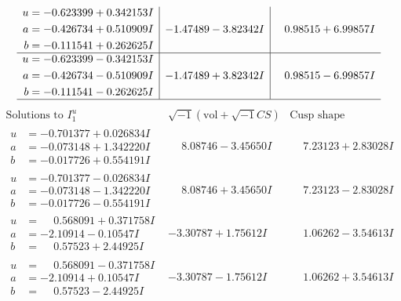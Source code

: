 \documentclass[1p]{elsarticle_modified}
\theoremstyle{definition}
\newcommand{\I}{\sqrt{-1}}
\begin{document}
$$\begin{array}{c|c|c}
\begin{aligned}
u &= -0.623399 + 0.342153 I \\
a &= -0.426734 + 0.510909 I \\
b &= -0.111541 + 0.262625 I\end{aligned}
 & -1.47489 - 3.82342 I & \phantom{-}0.98515 + 6.99857 I \\ \hline\begin{aligned}
u &= -0.623399 - 0.342153 I \\
a &= -0.426734 - 0.510909 I \\
b &= -0.111541 - 0.262625 I\end{aligned}
 & -1.47489 + 3.82342 I & \phantom{-}0.98515 - 6.99857 I\\
 \hline 
 \end{array}$$\newpage$$\begin{array}{c|c|c}  
\text{Solutions to }I^u_{1}& \I (\text{vol} + \sqrt{-1}CS) & \text{Cusp shape}\\
 \hline 
\begin{aligned}
u &= -0.701377 + 0.026834 I \\
a &= -0.073148 + 1.342220 I \\
b &= -0.017726 + 0.554191 I\end{aligned}
 & \phantom{-}8.08746 - 3.45650 I & \phantom{-}7.23123 + 2.83028 I \\ \hline\begin{aligned}
u &= -0.701377 - 0.026834 I \\
a &= -0.073148 - 1.342220 I \\
b &= -0.017726 - 0.554191 I\end{aligned}
 & \phantom{-}8.08746 + 3.45650 I & \phantom{-}7.23123 - 2.83028 I \\ \hline\begin{aligned}
u &= \phantom{-}0.568091 + 0.371758 I \\
a &= -2.10914 - 0.10547 I \\
b &= \phantom{-}0.57523 + 2.44925 I\end{aligned}
 & -3.30787 + 1.75612 I & \phantom{-}1.06262 - 3.54613 I \\ \hline\begin{aligned}
u &= \phantom{-}0.568091 - 0.371758 I \\
a &= -2.10914 + 0.10547 I \\
b &= \phantom{-}0.57523 - 2.44925 I\end{aligned}
 & -3.30787 - 1.75612 I & \phantom{-}1.06262 + 3.54613 I \\ \hline\begin{aligned}

\end{aligned}
\end{array}$$
\end{document}
